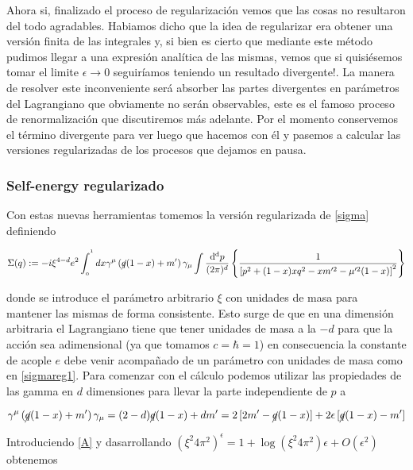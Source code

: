 \documentclass[tickz]{article}
\numberwithin{equation}{section}
\begin{document}
Ahora si, finalizado el proceso de regularización vemos que las cosas no resultaron del todo agradables. Habiamos dicho que la idea de regularizar era obtener una versión finita de las integrales y, si bien es cierto que mediante este método pudimos llegar a una expresión analítica de las mismas, vemos que si quisiésemos tomar el limite $ \epsilon \longrightarrow 0 $ seguiríamos teniendo un resultado divergente!. La manera de resolver este inconveniente será absorber las partes divergentes en parámetros del Lagrangiano que obviamente no serán observables, este es el famoso proceso de renormalización que discutiremos más adelante. Por el momento conservemos el término divergente para ver luego que hacemos con él y pasemos a calcular las versiones regularizadas de los procesos que dejamos en pausa. 

\subsubsection{Self-energy regularizado}

Con estas nuevas herramientas tomemos la versión regularizada de \ref{sigma} definiendo

\begin{equation}\label{sigmareg1}
\Sigma(q):=-i\xi^{4-d}e^{2}\int_{_{0}}^{^{1}}dx \gamma^{\mu}\left(\cancel{q}(1-x)+m'\right) \gamma_{\mu} \int\frac{\mathrm{d^d}p}{(2\pi)^d}\left\{\frac{1}{\left[p^{2}+(1-x)xq^{2}-xm'^{2}-\mu'^{2}(1-x)\right]^{2}}\right\}
\end{equation}

donde se introduce el parámetro arbitrario $ \xi $ con unidades de masa para mantener las mismas de forma consistente. Esto surge de que en una dimensión arbitraria el Lagrangiano tiene que tener unidades de masa a la $ -d $ para que la acción sea adimensional (ya que tomamos $ c=\hbar=1 $) en consecuencia la constante de acople $ e $ debe venir acompañado de un parámetro con unidades de masa como en \ref{sigmareg1}. Para comenzar con el cálculo podemos utilizar las propiedades de las gamma en $ d $ dimensiones para llevar la parte independiente de $ p $ a

\begin{equation}\label{A}
\gamma^{\mu}\left(\cancel{q}(1-x)+m'\right) \gamma_{\mu} = (2-d)\cancel{q}(1-x)+dm' = 2\left[2m' - \cancel{q}(1-x) \right] + 2\epsilon \left[ \cancel{q}(1-x) - m' \right]
\end{equation}

Introduciendo \ref{A} y dasarrollando $ \left(\xi^2 4 \pi^2\right)^\epsilon = 1 + \log\left(\xi^2 4 \pi^2\right) \epsilon + O(\epsilon^2)$ obtenemos
\end{document}
